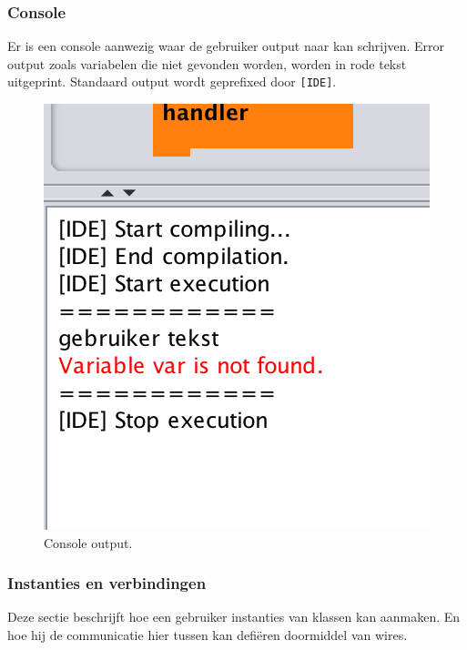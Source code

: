 \documentclass[]{article}
\begin{document}
\subsubsection{Console}
Er is een console aanwezig waar de gebruiker output naar kan schrijven.  Error output zoals variabelen die niet gevonden worden, worden in rode tekst uitgeprint. Standaard output wordt geprefixed door \texttt{[IDE]}. 
\begin{figure}[H]
  \centering
\includegraphics[scale=0.65]{Documentatie/images/console}
  \caption{Console output.} 
\end{figure}


\subsubsection{Instanties en verbindingen}
Deze sectie beschrijft hoe een gebruiker instanties van klassen kan aanmaken. En hoe hij de communicatie hier tussen kan defi\"{e}ren doormiddel van wires.
\end{document}
